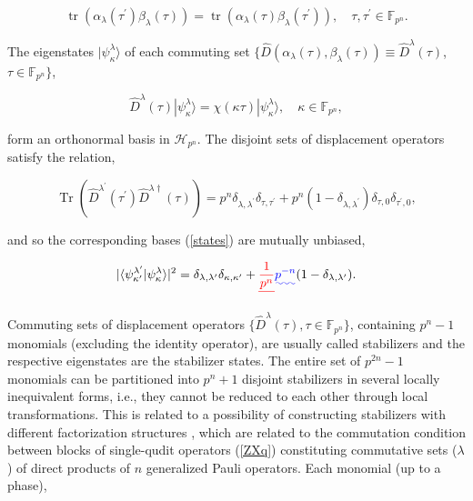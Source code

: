 \documentclass[quantumrep,article,submit,pdftex,moreauthors]{Definitions/mdpi}
\DeclareMathOperator{\tr}{tr}
\DeclareMathOperator{\Tr}{Tr}
\providecommand{\DIFadd}[1]{{\protect\color{blue}\uwave{#1}}} %
\providecommand{\DIFdel}[1]{{\protect\color{red}\sout{#1}}}                      %
\providecommand{\DIFaddbegin}{} %
\providecommand{\DIFaddend}{} %
\providecommand{\DIFdelbegin}{} %
\providecommand{\DIFdelend}{} %
\begin{document}
\begin{equation}
  \tr\left(\alpha_{\lambda}(\tau^{\prime})\beta_{\lambda }(\tau)\right)
  = \tr\left(\alpha_{\lambda}(\tau)\beta_{\lambda} (\tau^{\prime} )\right),
  \quad \tau,\tau^{\prime} \in \mathbb{F}_{p^{n}}.
  \label{CC}
\end{equation}

The eigenstates $|\psi_\kappa^\lambda\rangle$ of each commuting set
$\{\hat{D}\left(\alpha_{\lambda}(\tau),\beta_{\lambda}(\tau)\right) \equiv
\hat{D}^{\lambda}(\tau)$, $\tau \in \mathbb{F}_{p^{n}}\}$,

\begin{equation}
  \hat{D}^{\lambda}(\tau)|\psi_{\kappa}^{\lambda}\rangle
  = \chi(\kappa \tau) |\psi_{\kappa}^{\lambda}\rangle,
  \quad \kappa \in \mathbb{F}_{p^{n}},
  \label{states}
\end{equation}

form an orthonormal basis in $\mathcal{H}_{p^{n}}$. The disjoint sets of
displacement operators satisfy the relation,

\begin{equation*}
  \Tr\left(
    \hat{D}^{\lambda^{\prime}}(\tau^{\prime})\hat{D}^{\lambda\dagger}(\tau)
  \right)
  = p^{n} \delta_{\lambda,\lambda^{\prime}} \delta_{\tau,\tau^{\prime}}
  + p^{n}(1-\delta_{\lambda,\lambda^{\prime}}) \delta_{\tau,0}
  \delta_{\tau^{\prime},0},
\end{equation*}

and so the corresponding bases (\ref{states}) are mutually unbiased,

\begin{equation}
  |\langle\psi_{\kappa^{\prime}}^{\lambda^{\prime}}
  |\psi_{\kappa}^{\lambda}\rangle|^{2}
  = \delta_{\lambda,\lambda^{\prime}} \delta_{\kappa,\kappa^{\prime}}
  + \DIFdelbegin \DIFdel{\frac{1}{p^{n}} }\DIFdelend \DIFaddbegin \DIFadd{p^{-n} }\DIFaddend (1-\delta_{\lambda,\lambda^{\prime}}).
  \label{UB}
\end{equation}

Commuting sets of displacement operators $\{\hat{D}^{\lambda }(\tau), \tau \in
\mathbb{F}_{p^{n}}\}$, containing $p^{n}-1$ monomials (excluding the identity
operator), are usually called stabilizers and the respective eigenstates are
the
 stabilizer states. The entire set of $p^{2n}-1$ monomials can be
partitioned
 into $p^{n}+1$ disjoint stabilizers in several locally
inequivalent forms, i.e.,
 they cannot be reduced to each other through local
transformations. This is
 related to a possibility of constructing stabilizers
with different
 factorization structures \cite{factor1,factor2}, which are
related to the
 commutation condition between blocks of single-qudit operators
(\ref{ZXq})
 constituting commutative sets ($\lambda$) of direct products of
$n$
 generalized Pauli operators. Each monomial (up to a phase),
\end{document}
